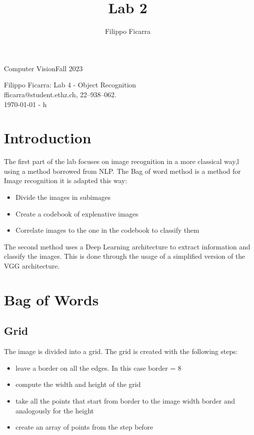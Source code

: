 \documentclass{ETHExercise}
\title{Lab 2}
\author{Filippo Ficarra}
\newcommand{\timestamp}{\ddmmyyyydate\today \,\,- \currenttime h}
\begin{document}
{}
{\Large Computer Vision}{Fall 2023}
\begin{center}
    {\Huge Filippo Ficarra: Lab 4 - Object Recognition}\\
      \quad\newline
      fficarra@student.ethz.ch, 22--938--062.\\
      \quad\newline
      \timestamp
      \end{center}

\section{Introduction}
The first part of the lab focuses on image recognition in a more 
classical way,l using a method borrowed from NLP. The Bag of word method is a 
method for Image recognition it is adapted this way:
\begin{itemize}
  \item Divide the images in subimages 
  \item Create a codebook of explenative images
  \item Correlate images to the one in the codebook to classify them
\end{itemize}

The second method uses a Deep Learning architecture to extract information
and classify the images. This is done through the usage of a simplified
version of the VGG architecture.

\section{Bag of Words}
\subsection{Grid}
The image is divided into a grid. The grid is created with the 
following steps:
\begin{itemize}
  \item leave a border on all the edges. In this case border = 8
  \item compute the width and height of the grid 
  \item take all the points that start from border to the image width border and analogously for the height
  \item create an array of points from the step before
\end{itemize}
\end{document}
